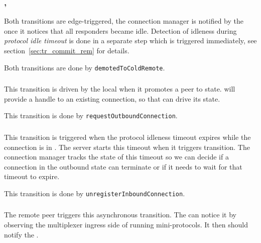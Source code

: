 \subsubsection{\DemotedToColdUniRem{}, \DemotedToColdDupRem{}}
Both transitions are edge-triggered, the connection manager is notified by the
\inbgov{} once it notices that all responders became idle. Detection of
idleness during \textit{protocol idle timeout} is done in a separate step which
is triggered immediately, see section~\ref{sec:tr_commit_rem} for details.

\begin{detail}
  Both transitions are done by \texttt{demotedToColdRemote}.
\end{detail}


\subsubsection{\PromotedToWarmDupLoc{}}
This transition is driven by the local \ptopgov{} when it promotes a \cold{} peer
to \warm{} state. \connmngr{} will provide a handle to an existing connection, so that
\ptopgov{} can drive its state.

\begin{detail}
This transition is done by \texttt{requestOutboundConnection}.
\end{detail}


\subsubsection{\TimeoutExpired{}}
This transition is triggered when the protocol idleness timeout expires while
the connection is in \OutboundStateDupTau{}. The server starts this timeout
when it triggers \DemotedToColdAnyRem{} transition. The connection manager
tracks the state of this timeout so we can decide if a connection in the outbound
state can terminate or if it needs to wait for that timeout to expire.

\begin{detail}
  This transition is done by \texttt{unregisterInboundConnection}.
\end{detail}


\subsubsection{\PromotedToWarmDupRem{}}
The remote peer triggers this asynchronous transition.  The \inbgov{}
can notice it by observing the multiplexer ingress side of running mini-protocols.
It then should notify the \connmngr{}.


